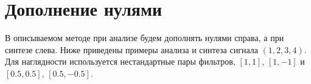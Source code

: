 \documentclass[oneside, final, 14pt]{extreport}
\begin{document}
\section{Дополнение нулями}
В описываемом методе при анализе будем дополнять нулями справа, а при синтезе слева. Ниже приведены примеры анализа и синтеза сигнала $(1,2,3,4)$. Для наглядности используется нестандартные пары фильтров, $[1,1]$, $[1,-1]$ и $[0.5,0.5]$, $[0.5,-0.5]$.
\begin{center}
\end{center}
\end{document}
